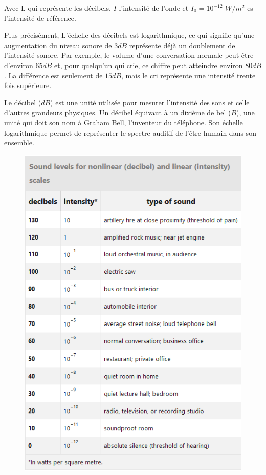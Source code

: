 \documentclass[conference,onecolumn]{IEEEtran}
\begin{document}
Avec L qui représente les décibels, $I$ l’intensité de l’onde et $I_0=10^{-12}$ $W/m^2$ es l’intensité de référence. 

Plus précisément, L’échelle des décibels est logarithmique, ce qui signifie qu’une augmentation du niveau sonore de $3 dB$ représente déjà un doublement de l’intensité sonore. Par exemple, le volume d’une conversation normale peut être d’environ $65 dB$ et, pour quelqu’un qui crie, ce chiffre peut atteindre environ $80 dB$. La différence est seulement de $15 dB$, mais le cri représente une intensité trente fois supérieure. 

Le décibel ($dB$) est une unité utilisée pour mesurer l'intensité des sons et celle d'autres grandeurs physiques. Un décibel équivaut à un dixième de bel ($B$), une unité qui doit son nom à Graham Bell, l'inventeur du téléphone. Son échelle logarithmique permet de représenter le spectre auditif de l’être humain dans son ensemble.

\begin{figure}[H]
 \centering
    \includegraphics[scale=0.6]{img2.png}
\end{figure}
\end{document}
